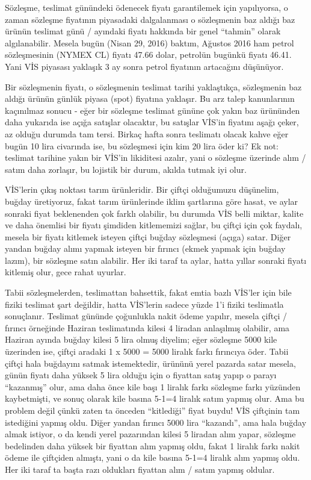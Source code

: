 \documentclass[12pt,fleqn]{article}\usepackage{../../common}
\begin{document}
Sözleşme, teslimat günündeki ödenecek fiyatı garantilemek için yapılıyorsa, o
zaman sözleşme fiyatının piyasadaki dalgalanması o sözleşmenin baz aldığı baz
ürünün teslimat günü / ayındaki fiyatı hakkında bir genel ``tahmin'' olarak
algılanabilir. Mesela bugün (Nisan 29, 2016) baktım, Ağustos 2016 ham petrol
sözleşmesinin (NYMEX CL) fiyatı 47.66 dolar, petrolün bugünkü fiyatı 46.41. Yani
VİS piyasası yaklaşık 3 ay sonra petrol fiyatının artacağını düşünüyor.

Bir sözleşmenin fiyatı, o sözleşmenin teslimat tarihi yaklaştıkça, sözleşmenin
baz aldığı ürünün günlük piyasa (spot) fiyatına yaklaşır. Bu arz talep
kanunlarının kaçınılmaz sonucu - eğer bir sözleşme teslimat gününe çok yakın baz
ürününden daha yukarıda ise açığa satışlar olacaktır, bu satışlar VİS'in
fiyatını aşağı çeker, az olduğu durumda tam tersi. Birkaç hafta sonra teslimatı
olacak kahve eğer bugün 10 lira civarında ise, bu sözleşmesi için kim 20 lira
öder ki? Ek not: teslimat tarihine yakın bir VİS'in likiditesi azalır, yani o
sözleşme üzerinde alım / satım daha zorlaşır, bu lojistik bir durum, akılda
tutmak iyi olur. 

VİS'lerin çıkış noktası tarım ürünleridir. Bir çiftçi olduğumuzu düşünelim,
buğday üretiyoruz, fakat tarım ürünlerinde iklim şartlarına göre hasat, ve aylar
sonraki fiyat beklenenden çok farklı olabilir, bu durumda VİS belli miktar,
kalite ve daha önemlisi bir fiyatı şimdiden kitlememizi sağlar, bu çiftçi için
çok faydalı, mesela bir fiyatı kitlemek isteyen çiftçi buğday sözleşmesi (açıga)
satar. Diğer yandan buğday alımı yapmak isteyen bir fırıncı (ekmek yapmak için
buğday lazım), bir sözleşme satın alabilir. Her iki taraf ta aylar, hatta yıllar
sonraki fiyatı kitlemiş olur, gece rahat uyurlar.

Tabii sözleşmelerden, teslimattan bahsettik, fakat emtia bazlı VİS'ler için bile
fiziki teslimat şart değildir, hatta VİS'lerin sadece yüzde 1'i fiziki
teslimatla sonuçlanır. Teslimat gününde çoğunlukla nakit ödeme yapılır, mesela
çiftçi / fırıncı örneğinde Haziran teslimatında kilesi 4 liradan anlaşılmış
olabilir, ama Haziran ayında buğday kilesi 5 lira olmuş diyelim; eğer sözleşme
5000 kile üzerinden ise, çiftçi aradaki 1 x 5000 = 5000 liralık farkı fırıncıya
öder. Tabii çiftçi hala buğdayını satmak istemektedir, ürününü yerel pazarda
satar mesela, günün fiyatı daha yüksek 5 lira olduğu için o fiyattan satış yapıp
o parayı ``kazanmış'' olur, ama daha önce kile başı 1 liralık farkı sözleşme
farkı yüzünden kaybetmişti, ve sonuç olarak kile basına 5-1=4 liralık satım
yapmış olur. Ama bu problem değil çünkü zaten ta önceden ``kitlediği'' fiyat
buydu! VİS çiftçinin tam istediğini yapmış oldu. Diğer yandan fırıncı 5000 lira
``kazandı'', ama hala buğday almak istiyor, o da kendi yerel pazarından kilesi 5
liradan alım yapar, sözleşme bedelinden daha yüksek bir fiyattan alım yapmış
oldu, fakat 1 liralık farkı nakit ödeme ile çiftçiden almıştı, yani o da kile
basına 5-1=4 liralık alım yapmış oldu. Her iki taraf ta başta razı oldukları
fiyattan alım / satım yapmış oldular.
\end{document}
